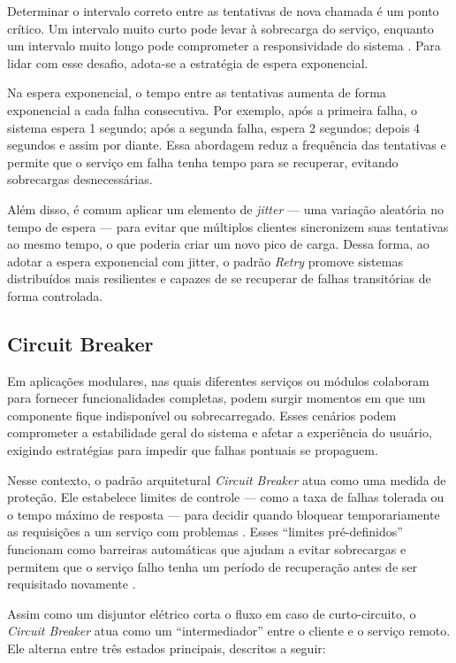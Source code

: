 Determinar o intervalo correto entre as tentativas de nova chamada é um ponto crítico. Um intervalo muito curto pode levar à sobrecarga do serviço, enquanto um intervalo muito longo pode comprometer a responsividade do sistema \citep{kostenko2023antifragile}. Para lidar com esse desafio, adota-se a estratégia de espera exponencial.

Na espera exponencial, o tempo entre as tentativas aumenta de forma exponencial a cada falha consecutiva. Por exemplo, após a primeira falha, o sistema espera 1 segundo; após a segunda falha, espera 2 segundos; depois 4 segundos e assim por diante. Essa abordagem reduz a frequência das tentativas e permite que o serviço em falha tenha tempo para se recuperar, evitando sobrecargas desnecessárias.

Além disso, é comum aplicar um elemento de \textit{jitter} — uma variação aleatória no tempo de espera — para evitar que múltiplos clientes sincronizem suas tentativas ao mesmo tempo, o que poderia criar um novo pico de carga. Dessa forma, ao adotar a espera exponencial com jitter, o padrão \textit{Retry} promove sistemas distribuídos mais resilientes e capazes de se recuperar de falhas transitórias de forma controlada.

\subsection{Circuit Breaker} 
Em aplicações modulares, nas quais diferentes serviços ou módulos colaboram para fornecer funcionalidades completas, podem surgir momentos em que um componente fique indisponível ou sobrecarregado. Esses cenários podem comprometer a estabilidade geral do sistema e afetar a experiência do usuário, exigindo estratégias para impedir que falhas pontuais se propaguem.

Nesse contexto, o padrão arquitetural \textit{Circuit Breaker} atua como uma medida de proteção. Ele estabelece limites de controle — como a taxa de falhas tolerada ou o tempo máximo de resposta — para decidir quando bloquear temporariamente as requisições a um serviço com problemas \citep{kostenko2023antifragile}. Esses “limites pré-definidos” funcionam como barreiras automáticas que ajudam a evitar sobrecargas e permitem que o serviço falho tenha um período de recuperação antes de ser requisitado novamente \citep{suprapto2021}.

Assim como um disjuntor elétrico corta o fluxo em caso de curto-circuito, o \textit{Circuit Breaker} atua como um “intermediador” entre o cliente e o serviço remoto. Ele alterna entre três estados principais, descritos a seguir:

